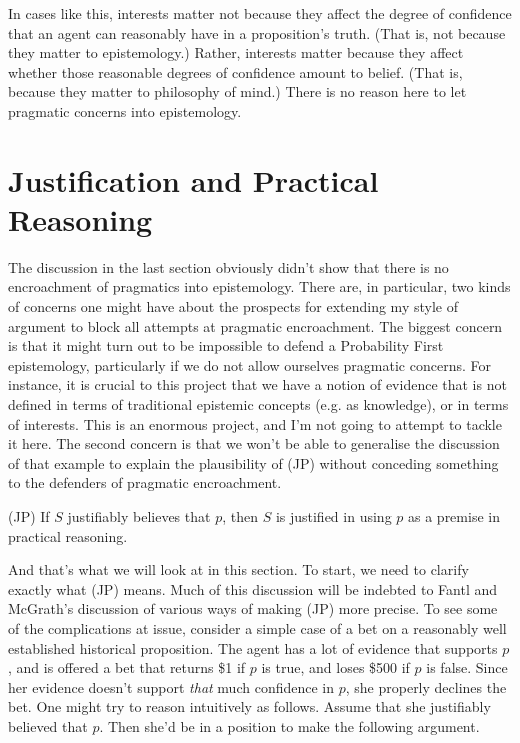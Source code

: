In cases like this, interests matter not because they affect the degree of confidence that an agent can reasonably have in a proposition's truth. (That is, not because they matter to epistemology.) Rather, interests matter because they affect whether those reasonable degrees of confidence amount to belief. (That is, because they matter to philosophy of mind.) There is no reason here to let pragmatic concerns into epistemology.


\section{Justification and Practical Reasoning}

The discussion in the last section obviously didn't show that there is no encroachment of pragmatics into epistemology. There are, in particular, two kinds of concerns one might have about the prospects for extending my style of argument to block all attempts at pragmatic encroachment. The biggest concern is that it might turn out to be impossible to defend a Probability First epistemology, particularly if we do not allow ourselves pragmatic concerns. For instance, it is crucial to this project that we have a notion of evidence that is not defined in terms of traditional epistemic concepts (e.g. as knowledge), or in terms of interests. This is an enormous project, and I'm not going to attempt to tackle it here. The second concern is that we won't be able to generalise the discussion of that example to explain the plausibility of (JP) without conceding something to the defenders of pragmatic encroachment.

\begin{description*}
\item[(JP)] If \(S\)  justifiably believes that \(p\), then \(S\)  is justified in using \(p\) as a premise in practical reasoning.
\end{description*}

\noindent And that's what we will look at in this section. To start, we need to clarify exactly what (JP) means. Much of this discussion will be indebted to Fantl and McGrath's discussion of various ways of making (JP) more precise. To see some of the complications at issue, consider a simple case of a bet on a reasonably well established historical proposition. The agent has a lot of evidence that supports \(p\), and is offered a bet that returns \$1 if \(p\) is true, and loses \$500 if \(p\) is false. Since her evidence doesn't support \textit{that} much confidence in \(p\), she properly declines the bet. One might try to reason intuitively as follows. Assume that she justifiably believed that \(p\). Then she'd be in a position to make the following argument.

